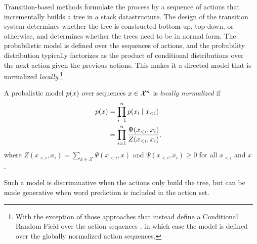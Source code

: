     Transition-based methods formulate the process by a sequence of actions that incrementally builds a tree in a stack datastructure. The design of the transition system determines whether the tree is constructed bottom-up, top-down, or otherwise, and determines whether the trees need to be in normal form. The probabilistic model is defined over the sequences of actions, and the probability distribution typically factorizes as the product of conditional distributions over the next action given the previous actions. This makes it a directed model that is normalized \textit{locally}.\footnote{With the exception of those approaches that instead define a Conditional Random Field over the action sequences \citep{andor2016globally}, in which case the model is defined over the globally normalized action sequences.}
    \begin{definition}{}
      A probalistic model $p(x)$ over sequences $x \in \mathcal{X}^n$ is \textit{locally normalized} if
      \begin{align*}
        p(x)
          &= \prod_{i=1}^{n} p(x_i \mid x_{<i})  \\
          &= \prod_{i=1}^{n} \frac{ \Psi( x_{<i}, x_{i} ) }{ Z( x_{<i}, x_{i} ) },
      \end{align*}
      where $Z( x_{<i}, x_{i} ) = \sum_{x \in \mathcal{X}} \Psi( x_{<i}, x )$ and $\Psi( x_{<i}, x_{i} ) \geq 0$ for all $x_{<i}$ and $x$.
    \end{definition}
    Such a model is discriminative when the actions only build the tree, but can be made generative when word prediction is included in the action set.

